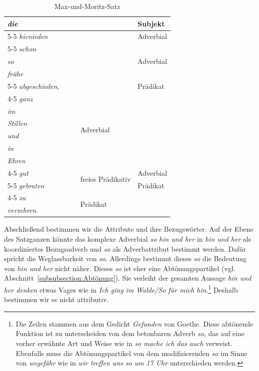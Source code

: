 \begin{table}
{\begin{tabular}{l|l|l|l|l}
    \textit{die} & & & & Subjekt \\ \cline{5-5}
    \textit{hienieden} & & & & Adverbial \\ \cline{5-5}
    \textit{schon} & & & & \multirow{3}{*}{Adverbial} \\ 
    \textit{so} & & & & \\ 
    \textit{frühe} & & & & \\ \cline{5-5}
    \textit{abgeschieden,} & & & & Prädikat \\ \cline{4-5}
    \textit{ganz} & & & \multirow{6}{*}{Adverbial} & \\ 
    \textit{im} & & & & \\ 
    \textit{Stillen} & & & & \\ 
    \textit{und} & & & & \\ 
    \textit{in} & & & & \\ 
    \textit{Ehren} & & & & \\ \cline{4-5}
    \textit{gut} & & & \multirow{2}{*}{freies Prädikativ} & Adverbial \\ \cline{5-5}
    \textit{gebraten} & & & & Prädikat \\ \cline{4-5}
    \textit{zu} & & & \multirow{2}{*}{Prädikat} & \\ 
    \textit{verzehren.} & & & & \\
    \hline 
  \end{tabular}
  }
  \caption{Max-und-Moritz-Satz}
  \label{tab:Busch_Satz}
\end{table}

Abschließend bestimmen wir die Attribute und ihre Bezugswörter. Auf der Ebene des Satzganzen könnte das komplexe Adverbial \textit{so hin und her} in \textit{hin und her} als koordiniertes Bezugsadverb und \textit{so} als Adverbattribut bestimmt werden. Dafür spricht die Weglassbarkeit von \textit{so}. Allerdings bestimmt dieses \textit{so} die Bedeutung von \textit{hin und her} nicht näher. Dieses \textit{so} ist eher eine Abtönungspartikel (vgl. Abschnitt~\ref{subsubsection:Abtönung}). Sie verleiht der gesamten Aussage \textit{hin und her denken} etwas Vages wie in \textit{Ich ging im Walde/So für mich hin}.\footnote{Die Zeilen stammen aus dem Gedicht \textit{Gefunden} von Goethe. Diese abtönende Funktion ist zu unterscheiden von dem betonbaren Adverb \textit{so}, das auf eine vorher erwähnte Art und Weise wie in \textit{so mache ich das auch} verweist. Ebenfalls muss die Abtönungspartikel von dem modifizierenden \textit{so} im Sinne von \textit{ungefähr} wie in \textit{wir treffen uns so um 17 Uhr} unterschieden werden.} Deshalb bestimmen wir es nicht attributiv.


